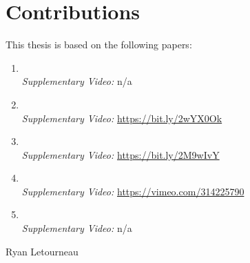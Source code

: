 \vspace*{4cm}
\chapter*{Contributions}
  This thesis is based on the following papers:
  
  \begin{enumerate}
  \footnotesize
  \item {} \cite{mcnabb2017sos}\\ \emph{Supplementary Video: }n/a
  \item {} \cite{mcnabb2018dynamic}\\ \emph{Supplementary Video: } \url{https://bit.ly/2wYX0Ok}
  \item {} \cite{mcnabb2018when}\\ \emph{Supplementary Video: } \url{https://bit.ly/2M9wIvY}
  \item {} \cite{mcnabb2019multivariateT}\\ \emph{Supplementary Video: }\url{https://vimeo.com/314225790}
  \item {} \cite{mcnabb2019how}\\ \emph{Supplementary Video:} n/a
  \end{enumerate}

  
 
{\hypersetup{linkcolor=black}
\tableofcontents
}

%
  {Ryan Letourneau}
\thispagestyle{empty}

